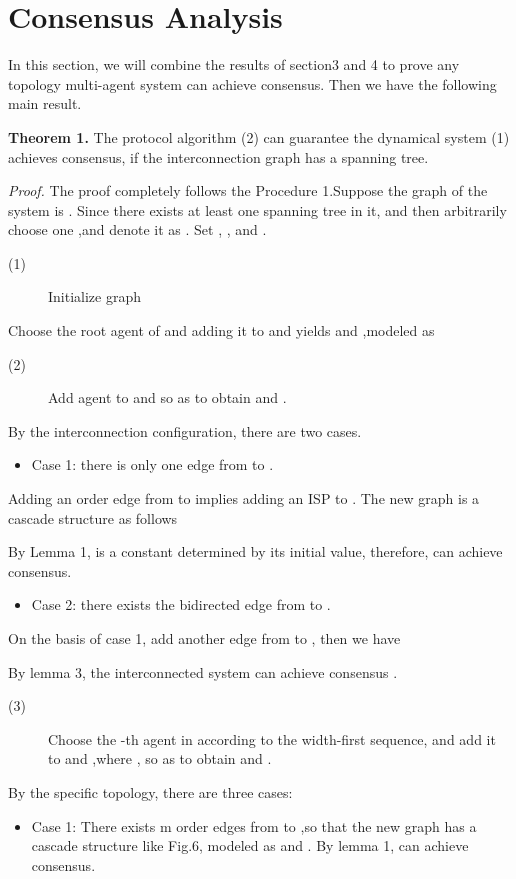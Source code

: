 \documentclass[english]{cccconf}
\begin{document}
{{\section{Consensus Analysis}

In this section, we will combine the results of section3 and 4 to prove any topology multi-agent system can achieve consensus.  Then we have the following main result.

{\textbf{Theorem 1. }} The protocol algorithm (2) can guarantee the dynamical system (1) achieves consensus, if the interconnection graph has a spanning tree.

\emph{{Proof.}} The proof completely follows the Procedure 1.Suppose the graph of the system is .
Since there exists at least one spanning tree in it, and then arbitrarily choose one ,and
denote it as  . Set  ,  , and  .

\begin{description}
  \item[(1)] Initialize graph 
  \end{description}

Choose the root agent    of  and adding it to  and   yields   and  ,modeled as


\begin{description}
  \item[(2)] Add agent  to   and   so as to obtain    and .
  \end{description}
  By  the interconnection configuration, there are two cases.
\begin{itemize}
  \item Case 1:  there is only  one edge from   to  .
\end{itemize}

Adding an order edge from   to  implies adding an ISP to . The new graph  is a cascade structure as follows

By Lemma 1,   is a constant determined by its initial value, therefore,   can achieve consensus.
\begin{itemize}
  \item Case 2:  there exists the  bidirected edge from    to  .
\end{itemize}
On the basis of case 1, add  another edge from   to    , then  we have

By lemma 3, the interconnected system  can achieve consensus .

\begin{description}
  \item[(3)]Choose the -th agent   in   according to the width-first sequence, and  add it to    and   ,where , so as to obtain  and .
  \end{description}
By the specific topology, there are three cases:
\begin{itemize}
  \item Case 1:  There exists m order edges from    to  ,so that the new graph  has a cascade structure  like Fig.6, modeled as   and . By lemma 1,  can achieve consensus.
\end{itemize}

}}
\end{document}
